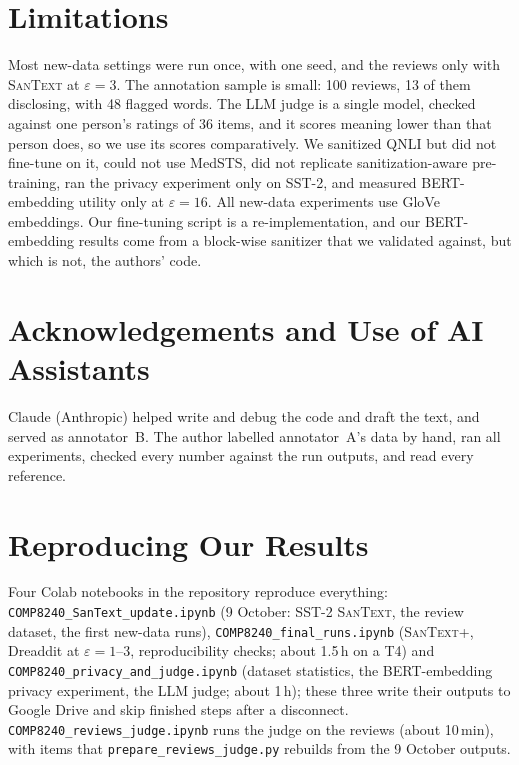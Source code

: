 \documentclass[11pt]{article}
\newcommand{\santext}{\textsc{SanText}}
\newcommand{\santextp}{\textsc{SanText}+}
\begin{document}
\section*{Limitations}
Most new-data settings were run once, with one seed, and the reviews only with \santext{} at $\varepsilon = 3$. The annotation sample is small: 100 reviews, 13 of them disclosing, with 48 flagged words. The LLM judge is a single model, checked against one person's ratings of 36 items, and it scores meaning lower than that person does, so we use its scores comparatively. We sanitized QNLI but did not fine-tune on it, could not use MedSTS, did not replicate sanitization-aware pre-training, ran the privacy experiment only on SST-2, and measured BERT-embedding utility only at $\varepsilon = 16$. All new-data experiments use GloVe embeddings. Our fine-tuning script is a re-implementation, and our BERT-embedding results come from a block-wise sanitizer that we validated against, but which is not, the authors' code.

\section*{Acknowledgements and Use of AI Assistants}
Claude (Anthropic) helped write and debug the code and draft the text, and served as annotator~B. The author labelled annotator~A's data by hand, ran all experiments, checked every number against the run outputs, and read every reference.



\appendix
\section{Reproducing Our Results}
\label{app:repro}
Four Colab notebooks in the repository reproduce everything: \texttt{COMP8240\_SanText\_update.ipynb} (9 October: SST-2 \santext{}, the review dataset, the first new-data runs), \texttt{COMP8240\_final\_runs.ipynb} (\santextp{}, Dreaddit at $\varepsilon = 1$--3, reproducibility checks; about 1.5\,h on a T4) and \texttt{COMP8240\_privacy\_and\_judge.ipynb} (dataset statistics, the BERT-embedding privacy experiment, the LLM judge; about 1\,h); these three write their outputs to Google Drive and skip finished steps after a disconnect. \texttt{COMP8240\_reviews\_judge.ipynb} runs the judge on the reviews (about 10\,min), with items that \texttt{prepare\_reviews\_judge.py} rebuilds from the 9 October outputs.
\end{document}
